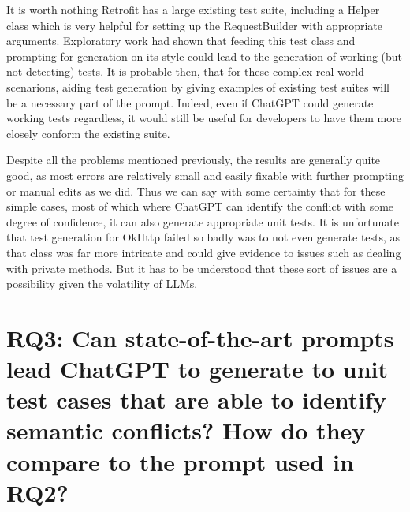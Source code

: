 It is worth nothing Retrofit has a large existing test suite, including a Helper class which is very helpful for setting up the RequestBuilder with appropriate arguments.
Exploratory work had shown that feeding this test class and prompting for generation on its style could lead to the generation of working (but not detecting) tests. It is probable then,
that for these complex real-world scenarions, aiding test generation by giving examples of existing test suites will be a necessary part of the prompt. Indeed, even if ChatGPT could generate
working tests regardless, it would still be useful for developers to have them more closely conform the existing suite.

Despite all the problems mentioned previously, the results are generally quite good, as most errors are relatively small and easily fixable with further prompting or manual edits as we did.
Thus we can say with some certainty that for these simple cases, most of which where ChatGPT can identify the conflict with some degree of confidence, it can also generate appropriate unit tests.
It is unfortunate that test generation for OkHttp failed so badly was to not even generate tests, as that class was far more intricate and could give evidence to issues such as dealing with
private methods. But it has to be understood that these sort of issues are a possibility given the volatility of LLMs.



\section{RQ3: Can state-of-the-art prompts lead ChatGPT to generate to
unit test cases that are able to identify semantic conflicts?  How do they
compare to the prompt used in RQ2?}\label{sec:results:rq3}



